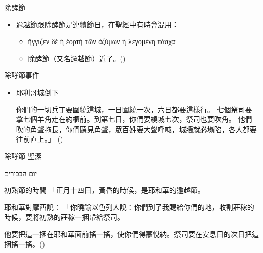 \documentclass{beamer}
\newcommand{\topic}[1]{
\begin{frame}
    \centering
    \vspace*{1cm}
    {\fontsize{40}{48}\selectfont #1\par}
    \vfill
\end{frame}
}
\newcommand{\conclusion}[2]{
\begin{frame}
    \centering
    \vspace*{1cm}
    {\fontsize{40}{48}\selectfont #1 \textemdash #2\par}
    \vfill
\end{frame}
}
\newcommand{\parvspace}{\par\vspace{0.5em}}
\begin{document}
\begin{frame}{除酵節}
    \begin{itemize}
        \item 逾越節跟除酵節是連續節日，在聖經中有時會混用：
              \begin{itemize}
                  \item \textgreek{ἤγγιζεν δὲ ἡ \alert{ἑορτὴ τῶν ἀζύμων} ἡ λεγομένη \alert{πάσχα}}\
                  \item 除酵節（又名逾越節）近了。()
              \end{itemize}
    \end{itemize}
\end{frame}

\begin{frame}{除酵節事件}
    \begin{itemize}
        \item 耶利哥城倒下\par
              你們的一切兵丁要圍繞這城，一日圍繞一次，六日都要這樣行。 七個祭司要拿七個羊角走在約櫃前。到第七日，你們要繞城七次，祭司也要吹角。 他們吹的角聲拖長，你們聽見角聲，眾百姓要大聲呼喊，城牆就必塌陷，各人都要往前直上。」 ()
    \end{itemize}
\end{frame}

\conclusion{除酵節}{聖潔}

\topic{\texthebrew{יוֹם הַבִּכּוּרִים}}

\begin{frame}{初熟節的時間}
    「正月十四日，黃昏的時候，是耶和華的逾越節。\textellipsis{}\parvspace
    耶和華對摩西說： 「你曉諭以色列人說：你們到了我賜給你們的地，收割莊稼的時候，要將初熟的莊稼一捆帶給祭司。\parvspace
    他要把這一捆在耶和華面前搖一搖，使你們得蒙悅納。祭司要在\alert{安息日的次日}把這捆搖一搖。()\parvspace
\end{frame}
\end{document}
